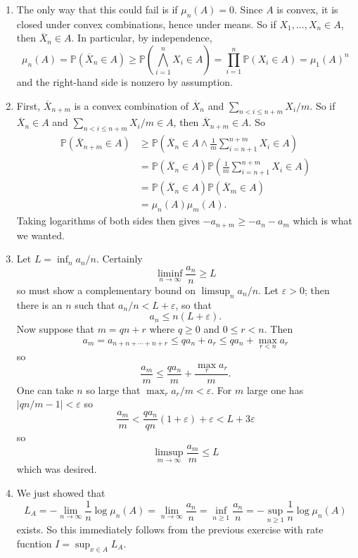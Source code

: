 \documentclass[10pt]{article}
\newcommand{\PP}{\mathbb P}
\theoremstyle{definition}
\begin{document}
\begin{enumerate}
\item The only way that this could fail is if $\mu_n(A) = 0$. Since $A$ is convex, it is closed under convex combinations, hence under means.
So if $X_1, \dots, X_n \in A$, then $\overline X_n \in A$. In particular, by independence,
$$\mu_n(A) = \PP(\overline X_n \in A) \geq \PP\left(\bigwedge_{i=1}^n X_i \in A\right) = \prod_{i=1}^n \PP(X_i \in A) = \mu_1(A)^n$$
and the right-hand side is nonzero by assumption.
\item First, $\overline X_{n+m}$ is a convex combination of $\overline X_n$ and $\sum_{n<i\leq n + m} X_i/m$. So if $\overline X_n \in A$ and $\sum_{n<i\leq n + m} X_i/m \in A$, then $\overline X_{n+m} \in A$. So
\begin{align*}\PP(\overline X_{n+m} \in A) &\geq \PP\left(\overline X_n \in A \wedge \frac{1}{m}\sum_{i=n+1}^{n+m} X_i \in A\right) \\
&= \PP(\overline X_n \in A) \PP\left(\frac{1}{m}\sum_{i=n+1}^{n+m} X_i \in A\right)\\
&= \PP(\overline X_n \in A) \PP(\overline X_m \in A) \\
&= \mu_n(A) \mu_m(A).\end{align*}
Taking logarithms of both sides then gives $-a_{n+m} \geq -a_n - a_m$ which is what we wanted.
\item Let $L = \inf_n a_n/n$. Certainly
$$\liminf_{n \to \infty} \frac{a_n}{n} \geq L$$
so must show a complementary bound on $\limsup_n a_n/n$.
Let $\varepsilon > 0$; then there is an $n$ such that $a_n/n < L + \varepsilon$, so that
$$a_n \leq n(L + \varepsilon).$$
Now suppose that $m = qn + r$ where $q \geq 0$ and $0 \leq r < n$. Then
$$a_m = a_{n+n+\cdots+n+r} \leq qa_n + a_r \leq qa_n + \max_{r<n} a_r$$
so
$$\frac{a_m}{m} \leq \frac{qa_n}{m} + \frac{\max_r a_r}{m}.$$
One can take $n$ so large that $\max_r a_r/m < \varepsilon$. For $m$ large one has $|qn/m - 1| < \varepsilon$ so
$$\frac{a_m}{m} < \frac{qa_n}{qn}(1 + \varepsilon) + \varepsilon < L + 3\varepsilon$$
so
$$\limsup_{m \to \infty} \frac{a_m}{m} \leq L$$
which was desired.
\item We just showed that
$$L_A = -\lim_{n \to \infty} \frac{1}{n} \log \mu_n(A) = \lim_{n \to \infty} \frac{a_n}{n} = \inf_{n \geq 1} \frac{a_n}{n} = -\sup_{n \geq 1} \frac{1}{n} \log \mu_n(A)$$
exists. So this immediately follows from the previous exercise with rate fucntion $I = \sup_{x \in A} L_A$.
\end{enumerate}
\end{document}
